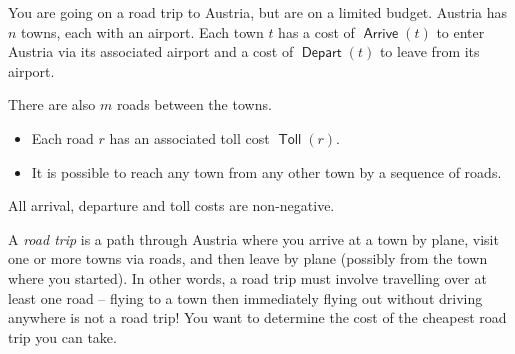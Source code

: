 \documentclass[12pt]{article}
\newcommand{\R}[1]{{\color{myred}#1}}
\newcommand{\B}[1]{{\color{myblue}#1}}
\DeclareMathOperator{\arr}{\mathsf{Arrive}}
\DeclareMathOperator{\dep}{\mathsf{Depart}}
\DeclareMathOperator{\toll}{\mathsf{Toll}}
\begin{document}
\begin{question}
You are going on a road trip to Austria, but are on a limited budget. Austria has $n$ towns, each with an airport. Each town $t$ has a cost of $\arr(t)$ to enter Austria via its associated airport and a cost of $\dep(t)$ to leave from its airport.

There are also $m$ roads between the towns.
\begin{itemize}
  \item Each road $r$ has an associated toll cost $\toll(r)$.
  \item It is possible to reach any town from any other town by a sequence of roads. 
\end{itemize}
All arrival, departure and toll costs are non-negative.

A \textit{road trip} is a path through Austria where you arrive at a town by plane, visit one or more towns via roads, and then leave by plane (possibly from the town where you started). In other words, a road trip must involve travelling over at least one road -- flying to a town then immediately flying out without driving anywhere is not a road trip! You want to determine the cost of the cheapest road trip you can take.

\begin{figure}[H]
    \centering
    \caption{}
    \label{example-1}
\end{figure}


\end{question}
\end{document}
